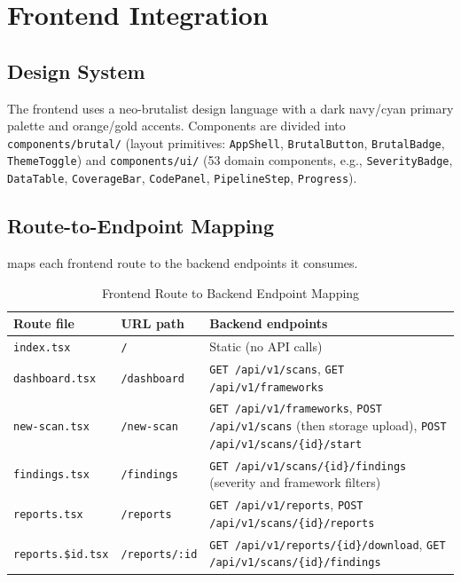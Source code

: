 \documentclass[conference]{IEEEtran}
\newcommand{\tsz}{\footnotesize}
\begin{document}
\section{Frontend Integration}
\label{sec:frontend}

\subsection{Design System}
The frontend uses a neo-brutalist design language with a dark navy/cyan primary
palette and orange/gold accents. Components are divided into
\texttt{components/brutal/} (layout primitives: \texttt{AppShell},
\texttt{BrutalButton}, \texttt{BrutalBadge}, \texttt{ThemeToggle}) and
\texttt{components/ui/} (53 domain components, e.g., \texttt{SeverityBadge},
\texttt{DataTable}, \texttt{CoverageBar}, \texttt{CodePanel},
\texttt{PipelineStep}, \texttt{Progress}).

\subsection{Route-to-Endpoint Mapping}
 maps each frontend route to the backend endpoints it consumes.

\begin{table}[!t]
\caption{Frontend Route to Backend Endpoint Mapping}
\label{tab:routes}
\centering\tsz
\begin{tabularx}{\textwidth}{@{}llX@{}}
\toprule
\textbf{Route file} & \textbf{URL path} & \textbf{Backend endpoints}\\
\midrule
\texttt{index.tsx} & \texttt{/} & Static (no API calls)\\
\texttt{dashboard.tsx} & \texttt{/dashboard} & \texttt{GET /api/v1/scans}, \texttt{GET /api/v1/frameworks}\\
\texttt{new-scan.tsx} & \texttt{/new-scan} & \texttt{GET /api/v1/frameworks}, \texttt{POST /api/v1/scans} (then storage upload), \texttt{POST /api/v1/scans/\{id\}/start}\\
\texttt{findings.tsx} & \texttt{/findings} & \texttt{GET /api/v1/scans/\{id\}/findings} (severity and framework filters)\\
\texttt{reports.tsx} & \texttt{/reports} & \texttt{GET /api/v1/reports}, \texttt{POST /api/v1/scans/\{id\}/reports}\\
\texttt{reports.\$id.tsx} & \texttt{/reports/:id} & \texttt{GET /api/v1/reports/\{id\}/download}, \texttt{GET /api/v1/scans/\{id\}/findings}\\
\bottomrule
\end{tabularx}
\end{table}
\end{document}
